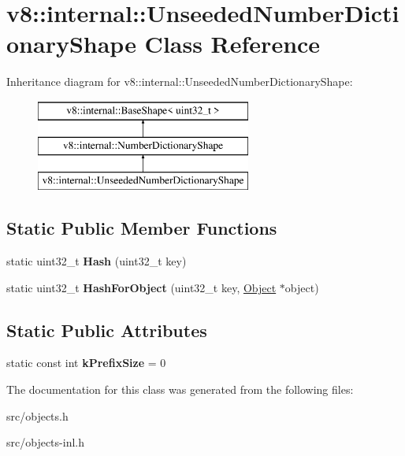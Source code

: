 \hypertarget{classv8_1_1internal_1_1_unseeded_number_dictionary_shape}{}\section{v8\+:\+:internal\+:\+:Unseeded\+Number\+Dictionary\+Shape Class Reference}
\label{classv8_1_1internal_1_1_unseeded_number_dictionary_shape}
Inheritance diagram for v8\+:\+:internal\+:\+:Unseeded\+Number\+Dictionary\+Shape\+:\begin{figure}[H]
\begin{center}
\leavevmode
\includegraphics[height=3.000000cm]{classv8_1_1internal_1_1_unseeded_number_dictionary_shape}
\end{center}
\end{figure}
\subsection*{Static Public Member Functions}
\begin{DoxyCompactItemize}
\item 
\hypertarget{classv8_1_1internal_1_1_unseeded_number_dictionary_shape_aa263aeb1e0592f9a83df6b3347adbf03}{}static uint32\+\_\+t {\bfseries Hash} (uint32\+\_\+t key)\label{classv8_1_1internal_1_1_unseeded_number_dictionary_shape_aa263aeb1e0592f9a83df6b3347adbf03}

\item 
\hypertarget{classv8_1_1internal_1_1_unseeded_number_dictionary_shape_afdf69967c4a50a70d54b2b767b54fd21}{}static uint32\+\_\+t {\bfseries Hash\+For\+Object} (uint32\+\_\+t key, \hyperlink{classv8_1_1internal_1_1_object}{Object} $\ast$object)\label{classv8_1_1internal_1_1_unseeded_number_dictionary_shape_afdf69967c4a50a70d54b2b767b54fd21}

\end{DoxyCompactItemize}
\subsection*{Static Public Attributes}
\begin{DoxyCompactItemize}
\item 
\hypertarget{classv8_1_1internal_1_1_unseeded_number_dictionary_shape_ab455952f7da70732c8171c1bd70faf27}{}static const int {\bfseries k\+Prefix\+Size} = 0\label{classv8_1_1internal_1_1_unseeded_number_dictionary_shape_ab455952f7da70732c8171c1bd70faf27}

\end{DoxyCompactItemize}


The documentation for this class was generated from the following files\+:\begin{DoxyCompactItemize}
\item 
src/objects.\+h\item 
src/objects-\/inl.\+h\end{DoxyCompactItemize}
